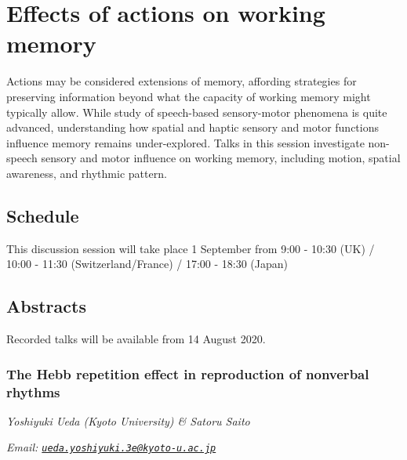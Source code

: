 \documentclass[
  12pt,
]{book}
\begin{document}
\hypertarget{effects-of-actions-on-working-memory}{%
\chapter{Effects of actions on working memory}\label{effects-of-actions-on-working-memory}}

Actions may be considered extensions of memory, affording strategies for preserving information beyond what the capacity of working memory might typically allow. While study of speech-based sensory-motor phenomena is quite advanced, understanding how spatial and haptic sensory and motor functions influence memory remains under-explored. Talks in this session investigate non-speech sensory and motor influence on working memory, including motion, spatial awareness, and rhythmic pattern.

\hypertarget{schedule}{%
\section{Schedule}\label{schedule}}

This discussion session will take place 1 September from 9:00 - 10:30 (UK) / 10:00 - 11:30 (Switzerland/France) / 17:00 - 18:30 (Japan)

\hypertarget{abstracts}{%
\section{Abstracts}\label{abstracts}}

Recorded talks will be available from 14 August 2020.

\hypertarget{the-hebb-repetition-effect-in-reproduction-of-nonverbal-rhythms}{%
\subsection{The Hebb repetition effect in reproduction of nonverbal rhythms}\label{the-hebb-repetition-effect-in-reproduction-of-nonverbal-rhythms}}

\emph{Yoshiyuki Ueda (Kyoto University) \& Satoru Saito}

\emph{Email: \href{mailto:ueda.yoshiyuki.3e@kyoto-u.ac.jp}{\nolinkurl{ueda.yoshiyuki.3e@kyoto-u.ac.jp}}}
\end{document}
